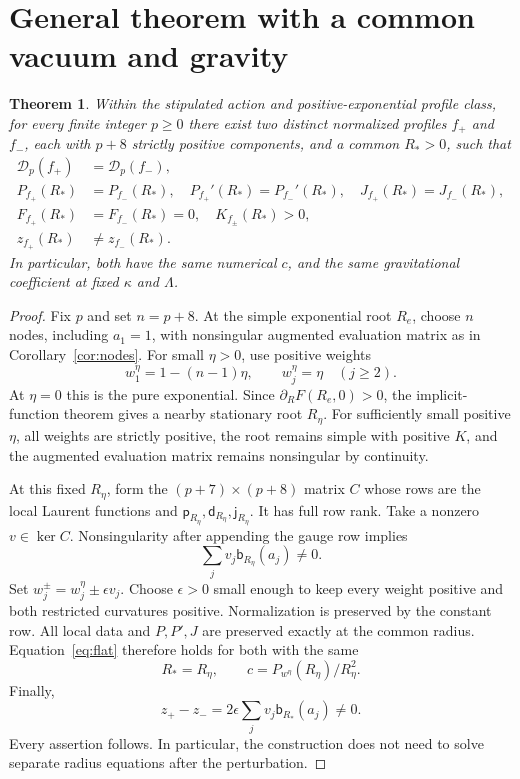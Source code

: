 \documentclass[11pt,letterpaper]{article}
\newtheorem{theorem}{Theorem}
\newcommand{\pker}{\mathsf p}
\newcommand{\jker}{\mathsf j}
\newcommand{\bker}{\mathsf b}
\newcommand{\dker}{\mathsf d}
\begin{document}
\section{General theorem with a common vacuum and gravity}

\begin{theorem}\label{thm:main}
Within the stipulated action and positive-exponential profile class, for every finite integer $p\geq0$ there exist two distinct normalized profiles $f_+$ and $f_-$, each with $p+8$ strictly positive components, and a common $R_*>0$, such that
\begin{align}
 \mathcal D_p(f_+)&=\mathcal D_p(f_-),\\
 P_{f_+}(R_*)&=P_{f_-}(R_*),\quad
 P_{f_+}'(R_*)=P_{f_-}'(R_*),\quad
 J_{f_+}(R_*)=J_{f_-}(R_*),\\
 F_{f_+}(R_*)&=F_{f_-}(R_*)=0,\quad K_{f_\pm}(R_*)>0,\\
 z_{f_+}(R_*)&\ne z_{f_-}(R_*).
\end{align}
In particular, both have the same numerical $c$, and the same gravitational coefficient at fixed $\kappa$ and $\Lambda$.
\end{theorem}

\begin{proof}
Fix $p$ and set $n=p+8$. At the simple exponential root $R_e$, choose $n$ nodes, including $a_1=1$, with nonsingular augmented evaluation matrix as in Corollary~\ref{cor:nodes}. For small $\eta>0$, use positive weights
\begin{equation}
 w_1^\eta=1-(n-1)\eta,\qquad w_j^\eta=\eta\quad(j\geq2).
\end{equation}
At $\eta=0$ this is the pure exponential. Since $\partial_RF(R_e,0)>0$, the implicit-function theorem gives a nearby stationary root $R_\eta$. For sufficiently small positive $\eta$, all weights are strictly positive, the root remains simple with positive $K$, and the augmented evaluation matrix remains nonsingular by continuity.

At this fixed $R_\eta$, form the $(p+7)\times(p+8)$ matrix $C$ whose rows are the local Laurent functions and $\pker_{R_\eta},\dker_{R_\eta},\jker_{R_\eta}$. It has full row rank. Take a nonzero $v\in\ker C$. Nonsingularity after appending the gauge row implies
\begin{equation}
 \sum_jv_j\bker_{R_\eta}(a_j)\ne0.
\end{equation}
Set $w_j^\pm=w_j^\eta\pm\epsilon v_j$. Choose $\epsilon>0$ small enough to keep every weight positive and both restricted curvatures positive. Normalization is preserved by the constant row. All local data and $P,P',J$ are preserved exactly at the common radius. Equation~\eqref{eq:flat} therefore holds for both with the same
\begin{equation}
 R_*=R_\eta,\qquad c=P_{w^\eta}(R_\eta)/R_\eta^2.
\end{equation}
Finally,
\begin{equation}
 z_+-z_-=2\epsilon\sum_jv_j\bker_{R_*}(a_j)\ne0.
\end{equation}
Every assertion follows. In particular, the construction does not need to solve separate radius equations after the perturbation.
\end{proof}
\end{document}
